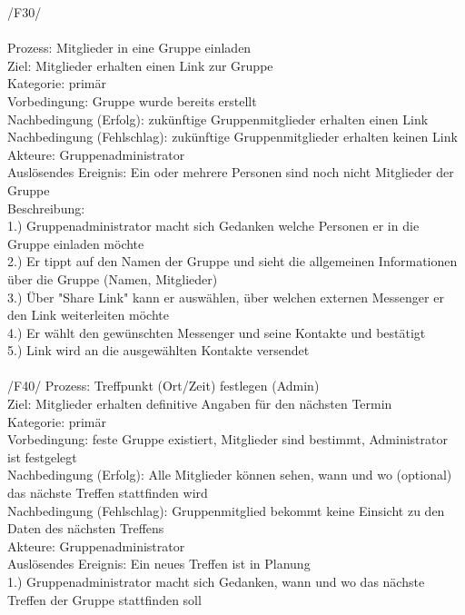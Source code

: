 /F30/ \\ \\
Prozess: Mitglieder in eine Gruppe einladen\\
Ziel: Mitglieder erhalten einen Link zur Gruppe\\
Kategorie: primär\\
Vorbedingung: Gruppe wurde bereits erstellt\\
Nachbedingung (Erfolg): zukünftige Gruppenmitglieder erhalten einen Link\\
Nachbedingung (Fehlschlag): zukünftige Gruppenmitglieder erhalten keinen Link\\
Akteure: Gruppenadministrator\\
Auslösendes Ereignis: Ein oder mehrere Personen sind noch nicht Mitglieder der Gruppe\\
Beschreibung:\\
1.) Gruppenadministrator macht sich Gedanken welche Personen er in die Gruppe einladen möchte\\
2.) Er tippt auf den Namen der Gruppe und sieht die allgemeinen Informationen über die Gruppe (Namen, Mitglieder)\\
3.) Über "Share Link" kann er auswählen, über welchen externen Messenger er den Link weiterleiten möchte\\
4.) Er wählt den gewünschten Messenger und seine Kontakte und bestätigt\\
5.) Link wird an die ausgewählten Kontakte versendet\\ \\
/F40/ Prozess: Treffpunkt (Ort/Zeit) festlegen (Admin)\\
Ziel: Mitglieder erhalten definitive Angaben für den nächsten Termin\\
Kategorie: primär\\
Vorbedingung: feste Gruppe existiert, Mitglieder sind bestimmt, Administrator ist festgelegt\\
Nachbedingung (Erfolg): Alle Mitglieder können sehen, wann und wo (optional) das nächste Treffen stattfinden wird\\
Nachbedingung (Fehlschlag): Gruppenmitglied bekommt keine Einsicht zu den Daten des nächsten Treffens\\
Akteure: Gruppenadministrator\\
Auslösendes Ereignis: Ein neues Treffen ist in Planung\\
1.) Gruppenadministrator macht sich Gedanken, wann und wo das nächste Treffen der Gruppe stattfinden soll\\
